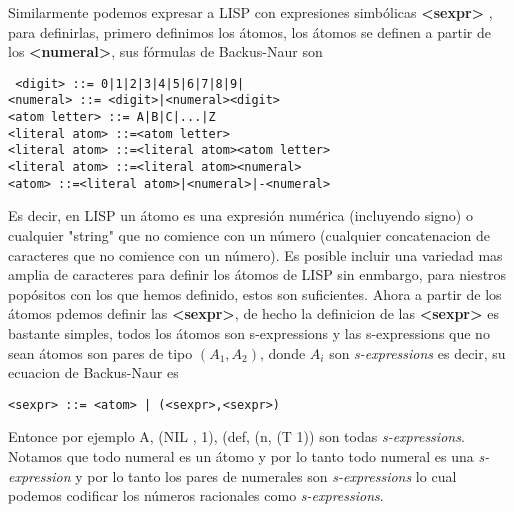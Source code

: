 \documentclass[11pt]{article}
\begin{document}
Similarmente podemos expresar a LISP con expresiones simbólicas \textbf{<sexpr>} , para definirlas, primero definimos los átomos, los átomos se definen a partir de los \textbf{<numeral>}, sus fórmulas de Backus-Naur son
\begin{verbatim}
 <digit> ::= 0|1|2|3|4|5|6|7|8|9|
<numeral> ::= <digit>|<numeral><digit>
<atom letter> ::= A|B|C|...|Z
<literal atom> ::=<atom letter>
<literal atom> ::=<literal atom><atom letter>
<literal atom> ::=<literal atom><numeral>
<atom> ::=<literal atom>|<numeral>|-<numeral>
\end{verbatim}
Es decir, en LISP un átomo es una expresión numérica (incluyendo signo)   o cualquier "string" que no comience con un número (cualquier concatenacion de caracteres que no comience con un número).  Es posible incluir una variedad mas amplia de caracteres para definir los átomos de LISP sin enmbargo, para niestros popósitos con los que hemos definido, estos son suficientes. Ahora a partir de los átomos pdemos definir las \textbf{<sexpr>}, de hecho la definicion de las \textbf{<sexpr>} es bastante simples, todos los átomos son s-expressions y las s-expressions que no sean átomos son pares de tipo \((A_1,A_2)\), donde \(A_i\) son \emph{s-expressions} es decir, su ecuacion de Backus-Naur es
\begin{verbatim}
<sexpr> ::= <atom> | (<sexpr>,<sexpr>)
\end{verbatim}
Entonce por ejemplo A, (NIL , 1), (def, (n, (T 1)) son todas \emph{s-expressions}. Notamos que todo numeral es un átomo y por lo tanto todo numeral es una \emph{s-expression} y por lo tanto los pares de numerales son \emph{s-expressions} lo cual podemos codificar los números racionales como \emph{s-expressions}.
\end{document}
